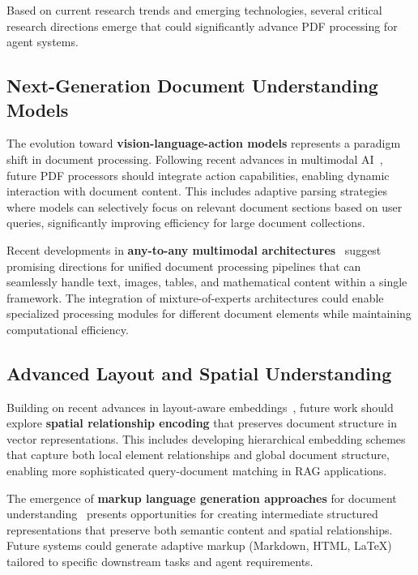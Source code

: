 \documentclass{article}
\begin{document}
Based on current research trends and emerging technologies, several critical research directions emerge that could significantly advance PDF processing for agent systems.

\subsection{Next-Generation Document Understanding Models}

The evolution toward \textbf{vision-language-action models} represents a paradigm shift in document processing. Following recent advances in multimodal AI~\cite{zhao2024comprehensive}, future PDF processors should integrate action capabilities, enabling dynamic interaction with document content. This includes adaptive parsing strategies where models can selectively focus on relevant document sections based on user queries, significantly improving efficiency for large document collections.

Recent developments in \textbf{any-to-any multimodal architectures}~\cite{gao2023retrieval} suggest promising directions for unified document processing pipelines that can seamlessly handle text, images, tables, and mathematical content within a single framework. The integration of mixture-of-experts architectures could enable specialized processing modules for different document elements while maintaining computational efficiency.

\subsection{Advanced Layout and Spatial Understanding}

Building on recent advances in layout-aware embeddings~\cite{huang2022layoutlmv3}, future work should explore \textbf{spatial relationship encoding} that preserves document structure in vector representations. This includes developing hierarchical embedding schemes that capture both local element relationships and global document structure, enabling more sophisticated query-document matching in RAG applications.

The emergence of \textbf{markup language generation approaches} for document understanding~\cite{zhang2024document} presents opportunities for creating intermediate structured representations that preserve both semantic content and spatial relationships. Future systems could generate adaptive markup (Markdown, HTML, LaTeX) tailored to specific downstream tasks and agent requirements.
\end{document}
